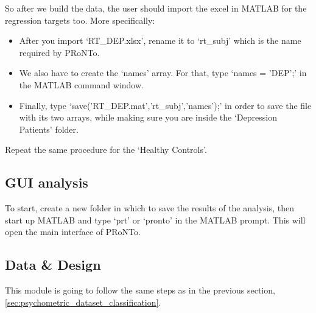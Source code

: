 So after we build the data, the user should import the excel in MATLAB for the regression targets too. More specifically:

\begin{itemize}
    \item After you import `RT\_DEP.xlsx', rename it to `rt\_subj' which is the name required by PRoNTo.
    
    \item We also have to create the `names' array. For that, type `names = {'DEP'};'  in the MATLAB command window.
    
    \item Finally, type `save('RT\_DEP.mat','rt\_subj','names');' in order to save the file with its two arrays, while making sure you are inside the `Depression Patients' folder.
    
\end{itemize}

Repeat the same procedure for the `Healthy Controls'.

\subsection{GUI analysis}

To start, create a new folder in which to save the results of the analysis, then start up MATLAB and type `prt' or `pronto' in the MATLAB prompt. This will open the main interface of PRoNTo.


\subsection{Data \& Design}

This module is going to follow the same steps as in the previous section, \ref{sec:psychometric_dataset_classification}.

